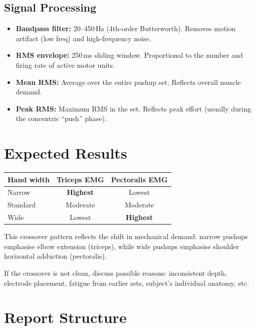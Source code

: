 \documentclass[11pt,letterpaper]{article}
\begin{document}
\subsection{Signal Processing}
\begin{itemize}[nosep]
    \item \textbf{Bandpass filter:} 20--450\,Hz (4th-order Butterworth).  Removes motion artifact (low freq) and high-frequency noise.
    \item \textbf{RMS envelope:} 250\,ms sliding window.  Proportional to the number and firing rate of active motor units.
    \item \textbf{Mean RMS:} Average over the entire pushup set.  Reflects overall muscle demand.
    \item \textbf{Peak RMS:} Maximum RMS in the set.  Reflects peak effort (usually during the concentric ``push'' phase).
\end{itemize}

\section{Expected Results}

\begin{center}
\renewcommand{\arraystretch}{1.3}
\begin{tabular}{@{} l c c @{}}
\toprule
\textbf{Hand width} & \textbf{Triceps EMG} & \textbf{Pectoralis EMG} \\
\midrule
Narrow   & \textbf{Highest} & Lowest \\
Standard & Moderate & Moderate \\
Wide     & Lowest & \textbf{Highest} \\
\bottomrule
\end{tabular}
\end{center}

This crossover pattern reflects the shift in mechanical demand: narrow pushups emphasise elbow extension (triceps), while wide pushups emphasise shoulder horizontal adduction (pectoralis).

If the crossover is not clean, discuss possible reasons: inconsistent depth, electrode placement, fatigue from earlier sets, subject's individual anatomy, etc.

\section{Report Structure}
\end{document}
